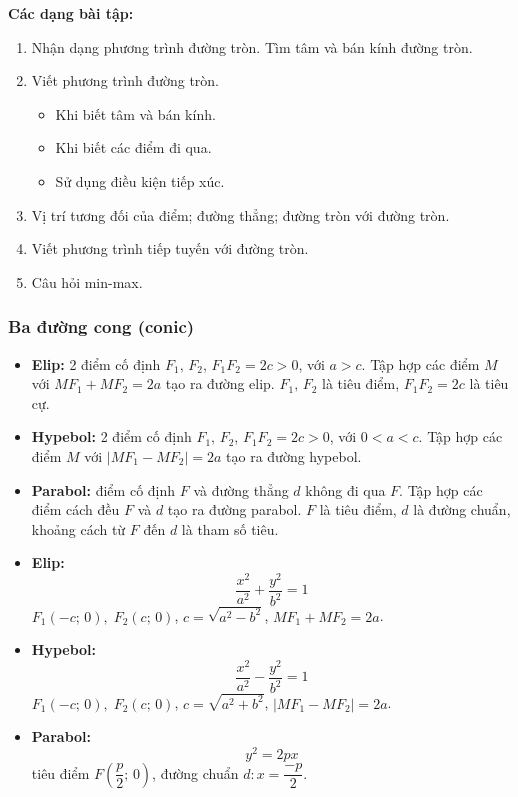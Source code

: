 \documentclass[12pt,a4paper]{article}
\begin{document}
\medskip\noindent\textbf{Các dạng bài tập:}
\begin{enumerate}[label=\textbf{Dạng \arabic*:}, leftmargin=*, align=left]
  \item Nhận dạng phương trình đường tròn. Tìm tâm và bán kính đường tròn.
  \item Viết phương trình đường tròn.
    \begin{itemize}
      \item Khi biết tâm và bán kính.
      \item Khi biết các điểm đi qua.
      \item Sử dụng điều kiện tiếp xúc.
    \end{itemize}
  \item Vị trí tương đối của điểm; đường thẳng; đường tròn với đường tròn.
  \item Viết phương trình tiếp tuyến với đường tròn.
  \item Câu hỏi min-max.
\end{enumerate}

\subsubsection{Ba đường cong (conic)}

\begin{dinhnghia}
  \begin{itemize}
    \item \textbf{Elip:} 2 điểm cố định $F_1,\, F_2$, $F_1F_2 = 2c > 0$, với $a > c$. Tập hợp các điểm $M$ với $MF_1 + MF_2 = 2a$ tạo ra đường elip. $F_1,\, F_2$ là tiêu điểm, $F_1F_2 = 2c$ là tiêu cự.
    \item \textbf{Hypebol:} 2 điểm cố định $F_1,\, F_2$, $F_1F_2 = 2c > 0$, với $0 < a < c$. Tập hợp các điểm $M$ với $|MF_1 - MF_2| = 2a$ tạo ra đường hypebol.
    \item \textbf{Parabol:} điểm cố định $F$ và đường thẳng $d$ không đi qua $F$. Tập hợp các điểm cách đều $F$ và $d$ tạo ra đường parabol. $F$ là tiêu điểm, $d$ là đường chuẩn, khoảng cách từ $F$ đến $d$ là tham số tiêu.
  \end{itemize}
\end{dinhnghia}

\begin{congthuc}[title={Phương trình chính tắc}]
  \begin{itemize}
    \item \textbf{Elip:}
      \[
        \dfrac{x^2}{a^2} + \dfrac{y^2}{b^2} = 1
      \]
      $F_1(-c;\, 0),\; F_2(c;\, 0)$, $c = \sqrt{a^2 - b^2}$, $MF_1 + MF_2 = 2a$.
    \item \textbf{Hypebol:}
      \[
        \dfrac{x^2}{a^2} - \dfrac{y^2}{b^2} = 1
      \]
      $F_1(-c;\, 0),\; F_2(c;\, 0)$, $c = \sqrt{a^2 + b^2}$, $|MF_1 - MF_2| = 2a$.
    \item \textbf{Parabol:}
      \[
        y^2 = 2px
      \]
      tiêu điểm $F\!\left(\dfrac{p}{2};\, 0\right)$, đường chuẩn $d\colon x = \dfrac{-p}{2}$.
  \end{itemize}
\end{congthuc}
\end{document}
